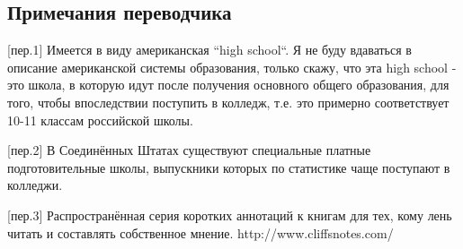 \documentclass[ebook,12pt,oneside,openany]{memoir}
\begin{document}
\subsection{Примечания переводчика}

[пер.1] Имеется в виду американская ``high school``. Я не буду вдаваться в описание американской системы образования, только скажу, что эта high school - это школа, в которую идут после получения основного общего образования, для того, чтобы впоследствии поступить в колледж, т.е. это примерно соответствует 10-11 классам российской школы. \newline

[пер.2] В Соединённых Штатах существуют специальные платные подготовительные школы, выпускники которых по статистике чаще поступают в колледжи. \newline

[пер.3] Распространённая серия коротких аннотаций к книгам для тех, кому лень читать и составлять собственное мнение. http://www.cliffsnotes.com/ \newline
\end{document}
